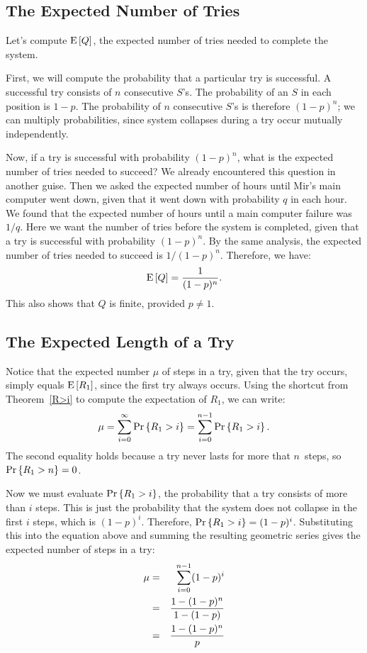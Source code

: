 \documentclass[11pt,twoside]{article}
\begin{document}
\subsection{The Expected Number of Tries}

Let's compute $\mathop{\textup{E}}\nolimits\left[Q\right]$, the expected number of tries needed to
complete the system.

First, we will compute the probability that a particular try is
successful.  A successful try consists of $n$ consecutive $S$'s.  The
probability of an $S$ in each position is $1-p$.  The probability of $n$
consecutive $S$'s is therefore $(1-p)^n$; we can multiply probabilities,
since system collapses during a try occur mutually independently.

Now, if a try is successful with probability $(1-p)^n$, what is the
expected number of tries needed to succeed?  We already encountered this
question in another guise.  Then we asked the expected number of hours
until Mir's main computer went down, given that it went down with
probability $q$ in each hour.  We found that the expected number of hours
until a main computer failure was $1/q$.  Here we want the number
of tries before the system is completed, given that a try is successful
with probability $(1-p)^n$.  By the same analysis, the expected number of
tries needed to succeed is $1/(1-p)^n$.  Therefore, we have:
\begin{equation}\label{eQ}
\mathop{\textup{E}}\nolimits\left[Q\right] = \frac{1}{(1-p)^n}.
\end{equation}
This also shows that $Q$ is finite, provided $p \neq 1$.

\subsection{The Expected Length of a Try}

Notice that the expected number $\mu$ of steps in a try, given that the
try occurs, simply equals $\mathop{\textup{E}}\nolimits\left[R_1\right]$, since the first try always
occurs.  Using the shortcut from Theorem~\ref{R>i} to compute the
expectation of $R_1$, we can write:
\begin{displaymath}
  \mu = \sum_{i=0}^{\infty} \mathop{\textup{Pr}}\nolimits\left\{R_1 > i\right\} = \sum_{i=0}^{n-1} \mathop{\textup{Pr}}\nolimits\left\{R_1 > i\right\}.
\end{displaymath}
The second equality holds because a try never lasts for more that
$n$~steps, so $\mathop{\textup{Pr}}\nolimits\left\{R_1 > n\right\} = 0$.

Now we must evaluate $\mathop{\textup{Pr}}\nolimits\left\{R_1 > i\right\}$, the probability that a try
consists of more than $i$ steps.  This is just the probability that
the system does not collapse in the first $i$ steps, which is
$(1-p)^i$.  Therefore, $\mathop{\textup{Pr}}\nolimits\left\{R_1 > i\right\} = (1-p)^i$.  Substituting this
into the equation above and summing the resulting geometric series
gives the expected number of steps in a try:
\begin{eqnarray}
\mu     & = & \sum_{i=0}^{n-1} (1-p)^i \notag\\
           & = & \frac{1 - (1-p)^n}{1 - (1-p)} \notag\\
           & = & \frac{1 - (1-p)^n}{p} \label{mufrac}
\end{eqnarray}
\end{document}
